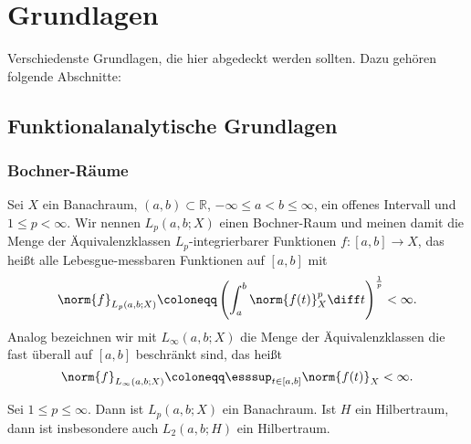 
\chapter{Grundlagen} %
\label{cha:grundlagen}

Verschiedenste Grundlagen, die hier abgedeckt werden sollten.
Dazu gehören folgende Abschnitte:

\section{Funktionalanalytische Grundlagen} %
\label{sec:funktionalanalytische_grundlagen}

\subsection{Bochner-Räume} %
\label{sub:bochner_r_ume}

\begin{Definition}
    Sei $X$ ein Banachraum, $(a, b) \subset \mathbb{R}$, $- \infty \leq a < b \leq \infty$, ein offenes Intervall und $1 \leq p < \infty$.
    Wir nennen $L_{p}(a, b; X)$ einen Bochner-Raum und meinen damit die Menge der Äquivalenzklassen $L_{p}$-integrierbarer Funktionen $f \colon [a, b] \to X$, das heißt alle Lebesgue-messbaren Funktionen auf $[a, b]$ mit
    \begin{equation}
        \norm{f}_{L_{p}(a, b; X)} \coloneqq \left( \int_{a}^{b} \norm{f(t)}_{X}^{p} \diff t \right)^{\frac 1 p} < \infty.
    \end{equation}
    Analog bezeichnen wir mit $L_{\infty}(a, b; X)$ die Menge der Äquivalenzklassen die fast überall auf $[a, b]$ beschränkt sind, das heißt
    \begin{equation}
        \norm{f}_{L_{\infty}(a, b; X)} \coloneqq \esssup_{t \in [a, b]} \norm{f(t)}_{X} < \infty.
    \end{equation}
\end{Definition}

\begin{Lemma}
    Sei $1 \leq p \leq \infty$. Dann ist $L_{p}(a, b; X)$ ein Banachraum.
    Ist $H$ ein Hilbertraum, dann ist insbesondere auch $L_{2}(a, b; H)$ ein Hilbertraum.
\end{Lemma}

